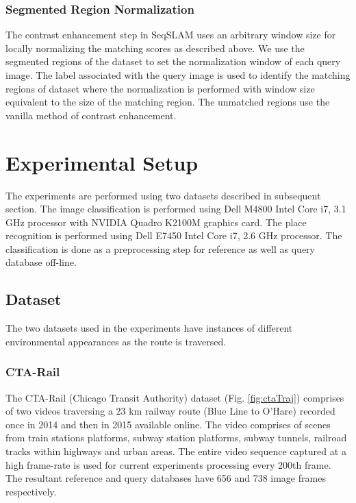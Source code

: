 \documentclass[letterpaper, 10 pt, conference]{ieeeconf}  %
\begin{document}
\subsubsection{Segmented Region Normalization}
The contrast enhancement step in SeqSLAM uses an arbitrary window size for locally normalizing the matching scores as described above. We use the segmented regions of the dataset to set the normalization window of each query image. The label associated with the query image is used to identify the matching regions of dataset where the normalization is performed with window size equivalent to the size of the matching region. The unmatched regions use the vanilla method of contrast enhancement.

\section{Experimental Setup}
The experiments are performed using two datasets described in subsequent section. The image classification is performed using Dell M4800 Intel Core i7, 3.1 GHz processor with NVIDIA Quadro K2100M graphics card. The place recognition is performed using Dell E7450 Intel Core i7, 2.6 GHz processor. The classification is done as a preprocessing step for reference as well as query database off-line.

\subsection{Dataset}
The two datasets used in the experiments have instances of different environmental appearances as the route is traversed.

\subsubsection{CTA-Rail}
The CTA-Rail (Chicago Transit Authority) dataset (Fig. \ref{fig:ctaTraj}) comprises of two videos traversing a 23 km railway route (Blue Line to O'Hare) recorded once in 2014 \cite{ctaRail2014} and then in 2015 \cite{ctaRail2015} available online. The video comprises of scenes from train stations platforms, subway station platforms, subway tunnels, railroad tracks within highways and urban areas. The entire video sequence captured at a high frame-rate is used for current experiments processing every 200th frame. The resultant reference and query databases have 656 and 738 image frames respectively.
\end{document}

